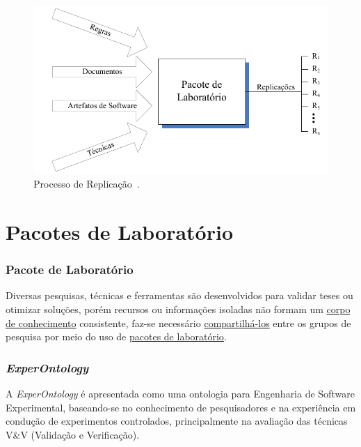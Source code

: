 \documentclass[aspectratio=169]{beamer}
\begin{document}
\begin{frame}
\justifying

\begin{figure}
\centering
\includegraphics[scale=0.45]{images/replicacao.png}
\caption{Processo de Replicação~\cite{Garcia06}.}
\label{image:replicacao}
\end{figure}

\end{frame}

\section{Pacotes de Laboratório}

\begin{frame}
\frametitle{Pacote de Laboratório}
\justifying
Diversas pesquisas, técnicas e ferramentas são desenvolvidos para validar teses ou otimizar soluções, porém recursos ou informações isoladas não formam um \underline{corpo de conhecimento} consistente, faz-se necessário \underline{compartilhá-los} entre os grupos de pesquisa por meio do uso de \underline{pacotes de laboratório}.

\end{frame}

\begin{frame}
\frametitle{\textit{ExperOntology}}
\justifying
A \textit{ExperOntology} é apresentada como uma ontologia para Engenharia de Software Experimental, baseando-se no conhecimento de pesquisadores e na experiência em condução de experimentos controlados, principalmente na avaliação das técnicas V\&V (Validação e Verificação).
\end{frame}
\end{document}
